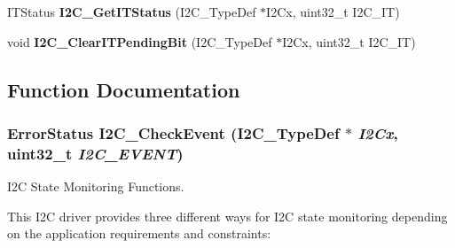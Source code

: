 \begin{DoxyCompactItemize}
\item 
\hypertarget{group__I2C__Exported__Functions_ga447771fbbd94a56f3570b9f430a069ba}{
ITStatus {\bfseries I2C\_\-GetITStatus} (I2C\_\-TypeDef $\ast$I2Cx, uint32\_\-t I2C\_\-IT)}
\label{group__I2C__Exported__Functions_ga447771fbbd94a56f3570b9f430a069ba}

\item 
\hypertarget{group__I2C__Exported__Functions_ga110dda440fa200b5f77349df19b3e6bb}{
void {\bfseries I2C\_\-ClearITPendingBit} (I2C\_\-TypeDef $\ast$I2Cx, uint32\_\-t I2C\_\-IT)}
\label{group__I2C__Exported__Functions_ga110dda440fa200b5f77349df19b3e6bb}

\end{DoxyCompactItemize}


\subsection{Function Documentation}
\hypertarget{group__I2C__Exported__Functions_ga2d5701342f9d4c1f09bf9d3cdcacc326}{
\subsubsection[{I2C\_\-CheckEvent}]{\setlength{\rightskip}{0pt plus 5cm}ErrorStatus I2C\_\-CheckEvent (I2C\_\-TypeDef $\ast$ {\em I2Cx}, \/  uint32\_\-t {\em I2C\_\-EVENT})}}
\label{group__I2C__Exported__Functions_ga2d5701342f9d4c1f09bf9d3cdcacc326}


I2C State Monitoring Functions. 

This I2C driver provides three different ways for I2C state monitoring depending on the application requirements and constraints:

